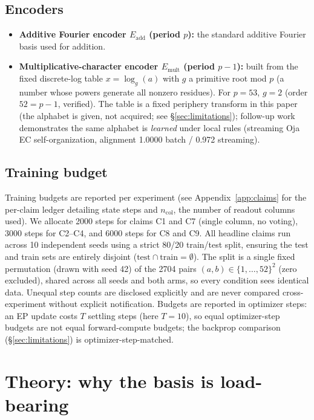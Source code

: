 \documentclass[11pt]{article}
\begin{document}
\subsection{Encoders}\label{sec:encoders}
\begin{itemize}
\item \textbf{Additive Fourier encoder $E_{\mathrm{add}}$ (period $p$):} the standard additive Fourier basis used for addition.
\item \textbf{Multiplicative-character encoder $E_{\mathrm{mult}}$ (period $p-1$):} built from the fixed discrete-log table $x = \log_g(a)$ with $g$ a primitive root mod $p$ (a number whose powers generate all nonzero residues). For $p=53$, $g=2$ (order $52=p-1$, verified). The table is a fixed periphery transform in this paper (the alphabet is given, not acquired; see \S\ref{sec:limitations}); follow-up work demonstrates the same alphabet is \emph{learned} under local rules (streaming Oja EC self-organization, alignment 1.0000 batch / 0.972 streaming).
\end{itemize}

\subsection{Training budget}\label{sec:budget}
Training budgets are reported per experiment (see Appendix~\ref{app:claims} for the per-claim ledger detailing state steps and $n_{\mathrm{col}}$, the number of readout columns used). We allocate 2000 steps for claims C1 and C7 (single column, no voting), 3000 steps for C2--C4, and 6000 steps for C8 and C9. All headline claims run across 10 independent seeds using a strict 80/20 train/test split, ensuring the test and train sets are entirely disjoint ($\mathrm{test} \cap \mathrm{train} = \emptyset$). The split is a single fixed permutation (drawn with seed 42) of the 2704 pairs $(a,b) \in \{1,\dots,52\}^2$ (zero excluded), shared across all seeds and both arms, so every condition sees identical data. Unequal step counts are disclosed explicitly and are never compared cross-experiment without explicit notification. Budgets are reported in optimizer steps: an EP update costs $T$ settling steps (here $T{=}10$), so equal optimizer-step budgets are not equal forward-compute budgets; the backprop comparison (\S\ref{sec:limitations}) is optimizer-step-matched.

\section{Theory: why the basis is load-bearing}\label{sec:theory}
\end{document}
